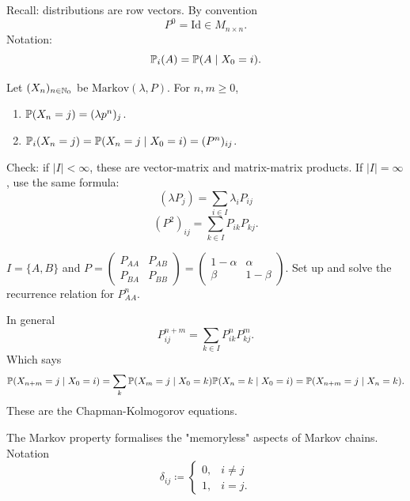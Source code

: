 \documentclass[10pt, a4paper]{article}
\begin{document}
Recall:
distributions are row vectors.
By convention
\[
P ^ 0 = \mathrm{Id} \in M_{n \times n}.
\]
Notation:
\[
\P_i(A) = \P(A \mid X_0 = i).
\]

\begin{theorem}
    Let $(X_n)_{n \in \N_0}$ be $\mathrm{Markov}(\lambda, P)$.
    For $n, m \geq 0$,
    \begin{enumerate}[label = (\roman*)]
        \item $\P(X_n = j) = (\lambda p ^ n)_j$.

        \item $\P_i(X_n = j) = \P(X_n = j \mid X_0 = i) = (P ^ n)_{ij}$.
    \end{enumerate}
\end{theorem}

Check:
if $|I| < \infty$,
these are vector-matrix and matrix-matrix products.
If $|I| = \infty$,
use the same formula:
\[
(\lambda P_j) = \sum_{i \in I}\lambda_{i}P_{ij}
\]
\[
(P ^ 2)_{ij} = \sum_{k \in I}P_{ik}P_{kj}.
\]

\begin{example}
    $I = \{A, B\}$ and $P = \begin{pmatrix}
        P_{AA} & P_{AB} \\ P_{BA} & P_{BB}
    \end{pmatrix} = \begin{pmatrix}
        1 - \alpha & \alpha \\ \beta & 1 - \beta
    \end{pmatrix}$.
    Set up and solve the recurrence relation for $P_{AA} ^ n$.
\end{example}

In general
\[
P_{ij} ^ {n + m} = \sum_{k \in I}P_{ik} ^ nP_{kj} ^ m.
\]
Which says
\[
\P(X_{n + m} = j \mid X_0 = i) = \sum_{k}\P(X_m = j \mid X_0 = k)\P(X_n = k \mid X_0 = i) = \P(X_{n + m} = j \mid X_n = k).
\]
These are the Chapman-Kolmogorov equations.

The Markov property formalises the
"memoryless"
aspects of Markov chains.
Notation
\[
\delta_{ij} \coloneqq \begin{cases}
    0, & i \neq j \\
    1, & i = j.
\end{cases}
\]
\end{document}
